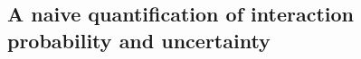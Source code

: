 \documentclass[12pt]{article}
\begin{document}
\begin{spacing}{2.0}



\section*{A naive quantification of interaction probability and uncertainty}






\end{spacing}
\end{document}
